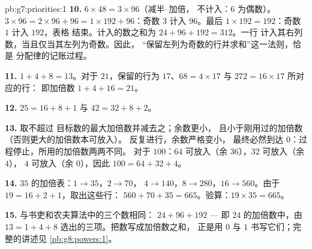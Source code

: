 \begin{solution}{pb:g7:priorities:1}
\textbf{10.} $6 \times 48 = 3 \times 96$（减半--加倍，
不计入：$6$ 为偶数）。$3 \times 96 = 2 \times 96 + 96 =
1 \times 192 + 96$：奇数 $3$ 计入 $96$。最后
$1 \times 192 = 192$：奇数 $1$ 计入 $192$，表格
结束。计入的数之和为 $24 + 96 + 192 = 312$。一行
计入其右列数，当且仅当其左列为奇数。因此，
“保留左列为奇数的行并求和”这一法则，恰是
分配律的记账过程。

\textbf{11.} $1 + 4 + 8 = 13$。对于 $21$，保留的行为
$17$、$68 = 4 \times 17$ 与 $272 = 16 \times 17$ 所对应的行：
即加倍数 $1 + 4 + 16 = 21$。

\textbf{12.} $25 = 16 + 8 + 1$ 与 $42 = 32 + 8 + 2$。

\textbf{13.} 取不超过
目标数的最大加倍数并减去之；余数更小，
且小于刚用过的加倍数（否则更大的加倍数本可放入）。
反复进行，余数严格变小，
最终必然到达 $0$：过程停止，所用的加倍数两两不同。
对于 $100$：$64$ 可放入（余 $36$），$32$ 可放入（余 $4$），
$4$ 可放入（余 $0$），因此 $100 = 64 + 32 + 4$。

\textbf{14.} $35$ 的加倍表：$1 \to 35$，$2 \to 70$，
$4 \to 140$，$8 \to 280$，$16 \to 560$。由于
$19 = 16 + 2 + 1$，取出这些行：
$560 + 70 + 35 = 665$。验算：$19 \times 35 = 665$。

\textbf{15.} 与书吏和农夫算法中的三个数相同：
$24 + 96 + 192$ --- 即 $24$ 的加倍数中，由
$13 = 1 + 4 + 8$ 选出的三项。把数写成加倍数之和，
正是用 $0$ 与 $1$ 书写它们；完整的讲述见
\cref{pb:g8:powers:1}。
\end{solution}
